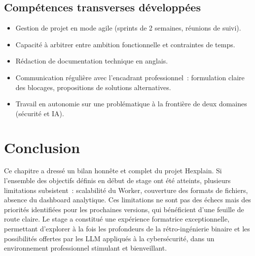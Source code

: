 \subsection{Compétences transverses développées}
\begin{itemize}
  \item Gestion de projet en mode agile (sprints de 2 semaines, réunions de suivi).
  \item Capacité à arbitrer entre ambition fonctionnelle et contraintes de temps.
  \item Rédaction de documentation technique en anglais.
  \item Communication régulière avec l'encadrant professionnel~: formulation claire des blocages, propositions de solutions alternatives.
  \item Travail en autonomie sur une problématique à la frontière de deux domaines (sécurité et IA).
\end{itemize}

\section{Conclusion}

Ce chapitre a dressé un bilan honnête et complet du projet Hexplain. Si l'ensemble des objectifs définis en début de stage ont été atteints, plusieurs limitations subsistent~: scalabilité du Worker, couverture des formats de fichiers, absence du dashboard analytique. Ces limitations ne sont pas des échecs mais des priorités identifiées pour les prochaines versions, qui bénéficient d'une feuille de route claire. Le stage a constitué une expérience formatrice exceptionnelle, permettant d'explorer à la fois les profondeurs de la rétro-ingénierie binaire et les possibilités offertes par les LLM appliqués à la cybersécurité, dans un environnement professionnel stimulant et bienveillant.

